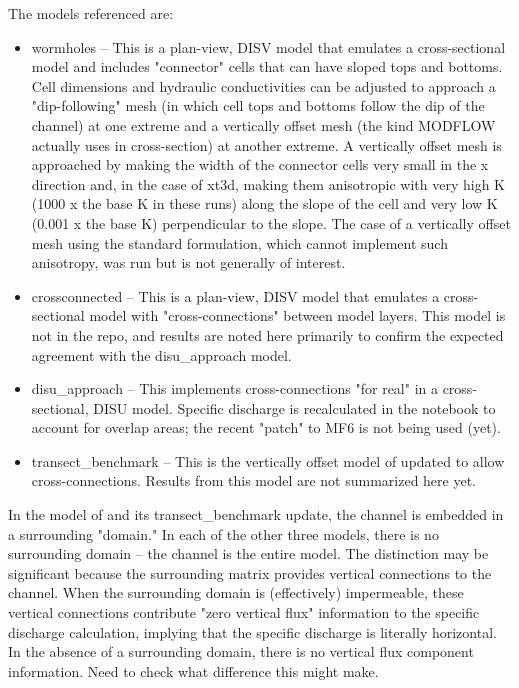 \documentclass{article}
\begin{document}
The models referenced are:
\begin{itemize}
	\item wormholes -- This is a plan-view, DISV model that emulates a cross-sectional model and includes "connector" cells that can have sloped tops and bottoms. Cell dimensions and hydraulic conductivities can be adjusted to approach a "dip-following" mesh (in which cell tops and bottoms follow the dip of the channel) at one extreme and a vertically offset mesh (the kind MODFLOW actually uses in cross-section) at another extreme. A vertically offset mesh is approached by making the width of the connector cells very small in the x direction and, in the case of xt3d, making them anisotropic with very high K (1000 x the base K in these runs) along the slope of the cell and very low K (0.001 x the base K) perpendicular to the slope. The case of a vertically offset mesh using the standard formulation, which cannot implement such anisotropy, was run but is not generally of interest.
	\item crossconnected -- This is a plan-view, DISV model that emulates a cross-sectional model with "cross-connections" between model layers. This model is not in the repo, and results are noted here primarily to confirm the expected agreement with the disu\_approach model.
	\item disu\_approach -- This implements cross-connections "for real" in a cross-sectional, DISU model. Specific discharge is recalculated in the notebook to account for overlap areas; the recent "patch" to MF6 is not being used (yet).
	\item transect\_benchmark -- This is the vertically offset model of \cite{bardot2022} updated to allow cross-connections. Results from this model are not summarized here yet.
\end{itemize}

In the model of \cite{bardot2022} and its transect\_benchmark update, the channel is embedded in a surrounding "domain."  In each of the other three models, there is no surrounding domain -- the channel is the entire model. The distinction may be significant because the surrounding matrix provides vertical connections to the channel. When the surrounding domain is (effectively) impermeable, these vertical connections contribute "zero vertical flux" information to the specific discharge calculation, implying that the specific discharge is literally horizontal. In the absence of a surrounding domain, there is no vertical flux component information. Need to check what difference this might make.
\end{document}
